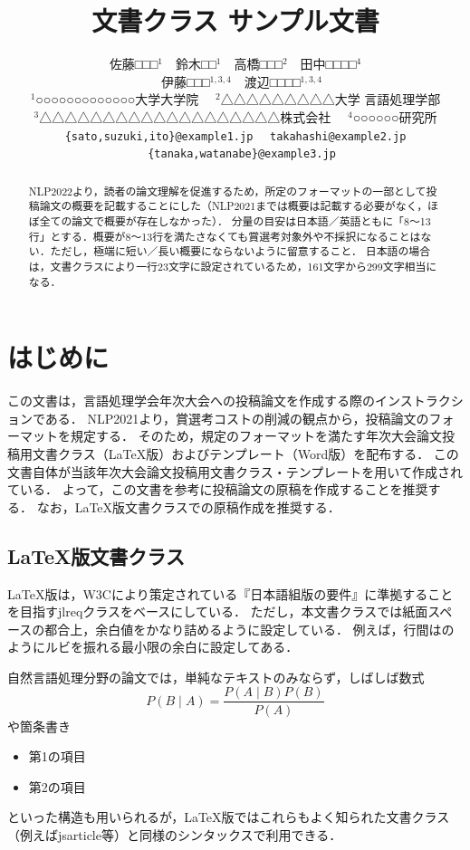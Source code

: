\documentclass[
  platex, dvipdfmx,  %
]{nlp2025}
\title{\pkg{NLP2025}文書クラス サンプル文書}
\author{%
  佐藤□□□${}^{1}$　鈴木□□${}^{1}$　高橋□□□${}^{2}$　田中□□□□${}^{4}$\\
　伊藤□□□${}^{1,3,4}$　渡辺□□□□${}^{1,3,4}$\\
${}^{1}$○○○○○○○○○○○○○大学大学院
　${}^{2}$△△△△△△△△△大学 言語処理学部\\
${}^{3}$△△△△△△△△△△△△△△△△△△△株式会社 　${}^{4}$○○○○○○研究所\\ \texttt{\{sato,suzuki,ito\}@example1.jp}
　\texttt{takahashi@example2.jp}\\
　\texttt{\{tanaka,watanabe\}@example3.jp}}
\newcommand{\pkg}[1]{\textsf{#1}}
\begin{document}
\maketitle
\begin{abstract}
NLP2022より，読者の論文理解を促進するため，所定のフォーマットの一部として投稿論文の概要を記載することにした（NLP2021までは概要は記載する必要がなく，ほぼ全ての論文で概要が存在しなかった）．
分量の目安は日本語／英語ともに「8〜13行」とする．概要が8〜13行を満たさなくても賞選考対象外や不採択になることはない．ただし，極端に短い／長い概要にならないように留意すること．
日本語の場合は，文書クラスにより一行23文字に設定されているため，161文字から299文字相当になる．
\end{abstract}

\section{はじめに}
この文書は，言語処理学会年次大会への投稿論文を作成する際のインストラクションである．
NLP2021より，賞選考コストの削減の観点から，投稿論文のフォーマットを規定する．
そのため，規定のフォーマットを満たす年次大会論文投稿用文書クラス（LaTeX版）およびテンプレート（Word版）を配布する．
この文書自体が当該年次大会論文投稿用文書クラス・テンプレートを用いて作成されている．
よって，この文書を参考に投稿論文の原稿を作成することを推奨する．
なお，LaTeX版文書クラスでの原稿作成を推奨する．

\subsection{LaTeX版文書クラス}
LaTeX版は，W3Cにより策定されている『日本語組版の要件』\cite{JLREQ}に準拠することを目指す\pkg{jlreq}クラスをベースにしている．
ただし，本文書クラスでは紙面スペースの都合上，余白値をかなり詰めるように設定している．
例えば，行間はのようにルビを振れる最小限の余白に設定してある．

自然言語処理分野の論文では，単純なテキストのみならず，しばしば数式
%
\begin{equation}
P(B\mid A) = \frac{P(A\mid B)P(B)}{P(A)}
\end{equation}
%
や箇条書き
%
\begin{itemize}
\item 第1の項目
\item 第2の項目
\end{itemize}
%
といった構造も用いられるが，LaTeX版ではこれらもよく知られた文書クラス（例えば\pkg{jsarticle}等）と同様のシンタックスで利用できる．
\end{document}
